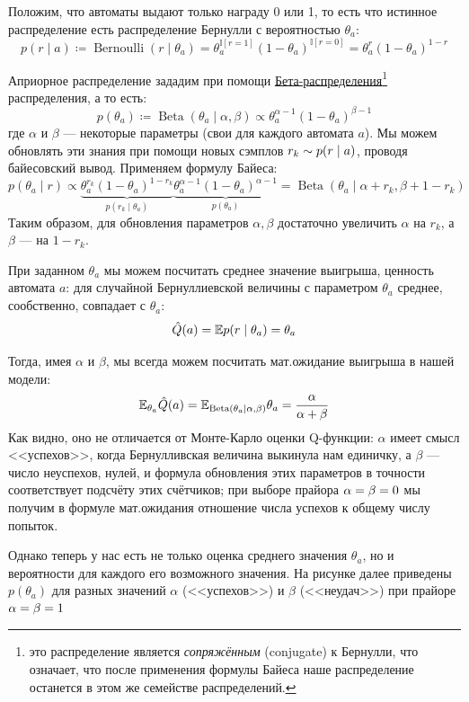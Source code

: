 \begin{example}
Положим, что автоматы выдают только награду 0 или 1, то есть что истинное распределение есть распределение Бернулли с вероятностью $\theta_a$:
$$p(r \mid a) \coloneqq \operatorname{Bernoulli}(r \mid \theta_a) = \theta_a^{\mathbb{I}[r = 1]}(1 - \theta_a)^{\mathbb{I}[r = 0]} = \theta_a^{r}(1 - \theta_a)^{1 - r}$$

Априорное распределение зададим при помощи \href{https://en.wikipedia.org/wiki/Beta_distribution}{Бета-распределения}\footnote[1]{это распределение является \emph{сопряжённым} (conjugate) к Бернулли, что означает, что после применения формулы Байеса наше распределение останется в этом же семействе распределений.} распределения, а то есть:
$$p(\theta_a) \coloneqq \operatorname{Beta}(\theta_a \mid \alpha, \beta) \propto \theta_a^{\alpha - 1}(1 - \theta_a)^{\beta - 1}$$
где $\alpha$ и $\beta$ --- некоторые параметры (свои для каждого автомата $a$). Мы можем обновлять эти знания при помощи новых сэмплов $r_k \HM\sim p(r \mid a)$, проводя байесовский вывод. Применяем формулу Байеса:
$$p(\theta_a \mid r) \propto \underbrace{\theta_a^{r_k}(1 - \theta_a)^{1 - r_k}}_{p(r_k \mid \theta_a)}\underbrace{\theta_a^{\alpha - 1}(1 - \theta_a)^{\alpha - 1}}_{p(\theta_a)} = \operatorname{Beta}(\theta_a \mid \alpha + r_k, \beta + 1 - r_k)$$
Таким образом, для обновления параметров $\alpha, \beta$ достаточно увеличить $\alpha$ на $r_k$, а $\beta$ --- на $1 - r_k$.

При заданном $\theta_a$ мы можем посчитать среднее значение выигрыша, ценность автомата $a$: для случайной Бернуллиевской величины с параметром $\theta_a$ среднее, сообственно, совпадает с $\theta_a$: 
$$\hat{Q}(a) = \mathbb{E} p(r \mid \theta_a) = \theta_a$$

Тогда, имея $\alpha$ и $\beta$, мы всегда можем посчитать мат.ожидание выигрыша в нашей модели:
$$\mathbb{E}_{\theta_a} \hat{Q}(a) = \mathbb{E}_{\operatorname{Beta}(\theta_a \mid \alpha, \beta)} \theta_a = \frac{\alpha}{\alpha + \beta}$$
Как видно, оно не отличается от Монте-Карло оценки Q-функции: $\alpha$ имеет смысл <<успехов>>, когда Бернулливская величина выкинула нам единичку, а $\beta$ --- число неуспехов, нулей, и формула обновления этих параметров в точности соответствует подсчёту этих счётчиков; при выборе прайора $\alpha \HM= \beta \HM= 0$ мы получим в формуле мат.ожидания отношение числа успехов к общему числу попыток. 

Однако теперь у нас есть не только оценка среднего значения $\theta_a$, но и вероятности для каждого его возможного значения. На рисунке далее приведены $p(\theta_a)$ для разных значений $\alpha$ (<<успехов>>) и $\beta$ (<<неудач>>) при прайоре $\alpha \HM= \beta \HM= 1$


\end{example}
